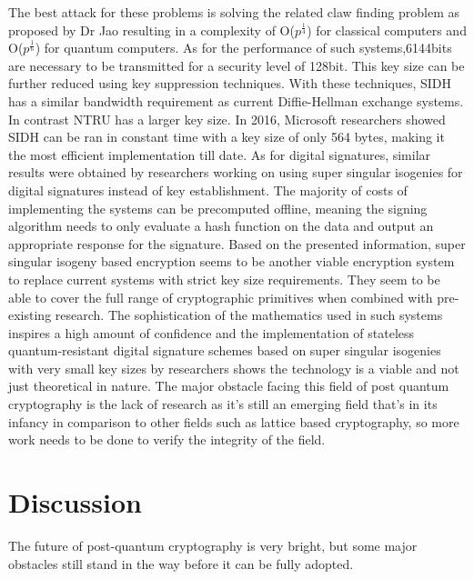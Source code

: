 \documentclass[10pt,a4paper]{IEEEtran}
\begin{document}
The best attack for these problems is solving the related claw finding problem as proposed by Dr Jao\cite{supersing}
resulting in a complexity of O(\(p^\frac{1}{4}\)) for classical computers and O(\(p^\frac{1}{6}\)) for quantum computers. 
\newline
\newline
As for the performance of such systems,6144bits are necessary to be transmitted for a security level of 128bit. This key size can be further reduced using key suppression techniques. With these techniques, SIDH has a similar bandwidth requirement as current Diffie-Hellman exchange systems. In contrast NTRU has a larger key size.
In 2016, Microsoft researchers showed SIDH can be ran in constant time with a key size of only 564 bytes, making it the most efficient implementation till date.
\newline
As for digital signatures, similar results were obtained by researchers working on using super singular isogenies for digital signatures instead of key establishment. The majority of costs of implementing the systems can be precomputed offline, meaning the signing algorithm needs to only evaluate a hash function on the data and output an appropriate response for the signature.
\newline
\newline
Based on the presented information, super singular isogeny based encryption seems to be another viable encryption system to replace current systems with strict key size requirements. They seem to be able to cover the full range of cryptographic primitives when combined with pre-existing research. The sophistication of the mathematics used in such systems inspires a high amount of confidence and the implementation of stateless quantum-resistant digital signature schemes based on super singular isogenies with very small key sizes by researchers shows the technology is a viable and not just theoretical in nature. The major obstacle facing this field of post quantum cryptography is the lack of research as it's still an emerging field that's in its infancy in comparison to other fields such as lattice based cryptography, so more work needs to be done to verify the integrity of the field.


\section{Discussion}

The future of post-quantum cryptography is very bright, but some major obstacles still stand in the way before it can be fully adopted.
\end{document}
